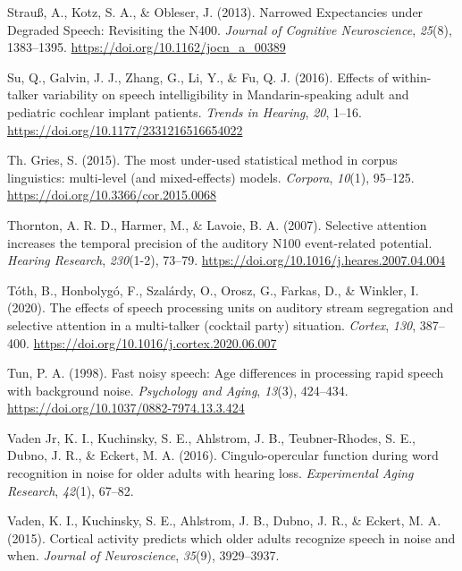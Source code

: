 \documentclass[a4paper, nobind]{templates/ociamthesis}
\newlength{\cslhangindent}
\newenvironment{CSLReferences}[2] %
 {%
  \setlength{\parindent}{0pt}
  \ifodd #1
  \let\oldpar\par
  \def\par{\hangindent=\cslhangindent\oldpar}
  \fi
  \setlength{\parskip}{1mm}
  \setlength{\baselineskip}{6mm}
 }%
 {}
\begin{document}
\begin{CSLReferences}{1}{0}
\leavevmode{}%
Strauß, A., Kotz, S. A., \& Obleser, J. (2013). Narrowed Expectancies under Degraded Speech: Revisiting the N400. \emph{Journal of Cognitive Neuroscience}, \emph{25}(8), 1383--1395. \url{https://doi.org/10.1162/jocn_a_00389}

\leavevmode{}%
Su, Q., Galvin, J. J., Zhang, G., Li, Y., \& Fu, Q. J. (2016). {Effects of within-talker variability on speech intelligibility in Mandarin-speaking adult and pediatric cochlear implant patients}. \emph{Trends in Hearing}, \emph{20}, 1--16. \url{https://doi.org/10.1177/2331216516654022}

\leavevmode{}%
Th. Gries, S. (2015). {The most under-used statistical method in corpus linguistics: multi-level (and mixed-effects) models}. \emph{Corpora}, \emph{10}(1), 95--125. \url{https://doi.org/10.3366/cor.2015.0068}

\leavevmode{}%
Thornton, A. R. D., Harmer, M., \& Lavoie, B. A. (2007). {Selective attention increases the temporal precision of the auditory N100 event-related potential}. \emph{Hearing Research}, \emph{230}(1-2), 73--79. \url{https://doi.org/10.1016/j.heares.2007.04.004}

\leavevmode{}%
Tóth, B., Honbolygó, F., Szalárdy, O., Orosz, G., Farkas, D., \& Winkler, I. (2020). {The effects of speech processing units on auditory stream segregation and selective attention in a multi-talker (cocktail party) situation}. \emph{Cortex}, \emph{130}, 387--400. \url{https://doi.org/10.1016/j.cortex.2020.06.007}

\leavevmode{}%
Tun, P. A. (1998). {Fast noisy speech: Age differences in processing rapid speech with background noise}. \emph{Psychology and Aging}, \emph{13}(3), 424--434. \url{https://doi.org/10.1037/0882-7974.13.3.424}

\leavevmode{}%
Vaden Jr, K. I., Kuchinsky, S. E., Ahlstrom, J. B., Teubner-Rhodes, S. E., Dubno, J. R., \& Eckert, M. A. (2016). Cingulo-opercular function during word recognition in noise for older adults with hearing loss. \emph{Experimental Aging Research}, \emph{42}(1), 67--82.

\leavevmode{}%
Vaden, K. I., Kuchinsky, S. E., Ahlstrom, J. B., Dubno, J. R., \& Eckert, M. A. (2015). Cortical activity predicts which older adults recognize speech in noise and when. \emph{Journal of Neuroscience}, \emph{35}(9), 3929--3937.


\end{CSLReferences}
\end{document}
